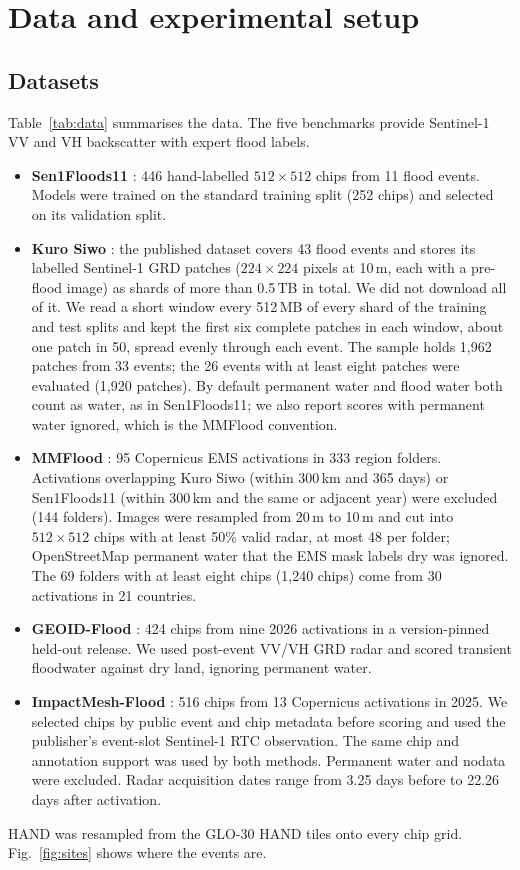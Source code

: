 \documentclass[a4paper,fleqn]{cas-sc}
\begin{document}
\section{Data and experimental setup}
\label{sec:setup}

\subsection{Datasets}
Table~\ref{tab:data} summarises the data. The five benchmarks provide Sentinel-1 VV and VH backscatter with expert flood labels.
\begin{itemize}
\item \textbf{Sen1Floods11} \citep{bonafilia2020sen1floods11}: 446 hand-labelled $512\times512$ chips from 11 flood events. Models were trained on the standard training split (252 chips) and selected on its validation split.
\item \textbf{Kuro Siwo} \citep{bountos2024kurosiwo}: the published dataset covers 43 flood events and stores its labelled Sentinel-1 GRD patches ($224\times224$ pixels at 10\,m, each with a pre-flood image) as shards of more than 0.5\,TB in total. We did not download all of it. We read a short window every 512\,MB of every shard of the training and test splits and kept the first six complete patches in each window, about one patch in 50, spread evenly through each event. The sample holds 1,962 patches from 33 events; the 26 events with at least eight patches were evaluated (1,920 patches). By default permanent water and flood water both count as water, as in Sen1Floods11; we also report scores with permanent water ignored, which is the MMFlood convention.
\item \textbf{MMFlood} \citep{montello2022mmflood}: 95 Copernicus EMS activations in 333 region folders. Activations overlapping Kuro Siwo (within 300\,km and 365 days) or Sen1Floods11 (within 300\,km and the same or adjacent year) were excluded (144 folders). Images were resampled from 20\,m to 10\,m and cut into $512\times512$ chips with at least 50\% valid radar, at most 48 per folder; OpenStreetMap permanent water that the EMS mask labels dry was ignored. The 69 folders with at least eight chips (1,240 chips) come from 30 activations in 21 countries.
\item \textbf{GEOID-Flood} \citep{chiriaco2026geoid}: 424 chips from nine 2026 activations in a version-pinned held-out release. We used post-event VV/VH GRD radar and scored transient floodwater against dry land, ignoring permanent water.
\item \textbf{ImpactMesh-Flood} \citep{impactmesh2026}: 516 chips from 13 Copernicus activations in 2025. We selected chips by public event and chip metadata before scoring and used the publisher's event-slot Sentinel-1 RTC observation. The same chip and annotation support was used by both methods. Permanent water and nodata were excluded. Radar acquisition dates range from 3.25 days before to 22.26 days after activation.
\end{itemize}
HAND was resampled from the GLO-30 HAND tiles \citep{glo30hand2022} onto every chip grid. Fig.~\ref{fig:sites} shows where the events are.
\end{document}
